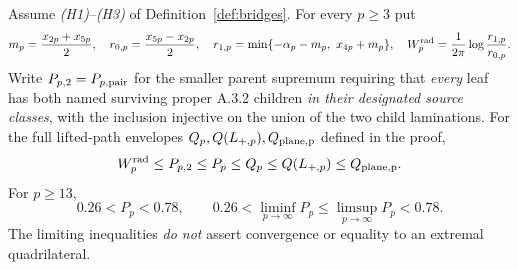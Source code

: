 \begin{theorem}
\label{thm:sandwich}
Assume \emph{(H1)}--\emph{(H3)} of
Definition~\ref{def:bridges}.
For every $p\ge3$ put
\[
 m_p=\frac{x_{2p}+x_{5p}}2,\quad
 r_{0,p}=\frac{x_{5p}-x_{2p}}2,\quad
 r_{1,p}=\min\{-\alpha_p-m_p,\ x_{4p}+m_p\},\quad
 W_p^{\rm rad}=\frac1{2\pi}\log\frac{r_{1,p}}{r_{0,p}}.
\]
Write $P_{p,2}=P_{p,\mathrm{pair}}$ for the smaller parent
supremum requiring that \emph{every}
leaf has both named surviving proper
A.3.2 children \emph{in their designated
source classes}, with the inclusion
injective on the union of the two
child laminations.  For the full lifted-path
envelopes $Q_p,Q(L_{+,p}),Q_{\rm plane,p}$
defined in the proof,
\begin{equation}\label{eq:sandwich}
 W_p^{\rm rad}\le P_{p,2}\le P_p
 \le Q_p\le Q(L_{+,p})\le Q_{\rm plane,p}.
\end{equation}
For $p\ge13$,
\[
 0.26<P_p<0.78,\qquad
 0.26<\liminf_{p\to\infty}P_p
 \le\limsup_{p\to\infty}P_p<0.78.
\]
The limiting inequalities \emph{do not}
assert convergence or equality to an
extremal quadrilateral.
\end{theorem}
